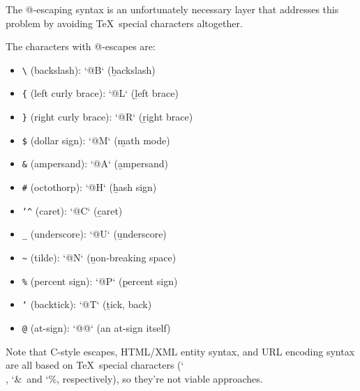 The @-escaping syntax is an unfortunately necessary layer that addresses this
problem by avoiding \TeX\ special characters altogether.

The characters with @-escapes are:
\begin{itemize}
    \item \b{\texttt{\textbackslash} (backslash)}: \tex`@B` (\b{b}ackslash)
    \item \b{\texttt{\{} (left curly brace)}: \tex`@L` (\b{l}eft brace)
    \item \b{\texttt{\}} (right curly brace)}: \tex`@R` (\b{r}ight brace)
    \item \b{\texttt{\$} (dollar sign)}: \tex`@M` (\b{m}ath mode)
    \item \b{\texttt{\&} (ampersand)}: \tex`@A` (\b{a}mpersand)
    \item \b{\texttt{\#} (octothorp)}: \tex`@H` (\b{h}ash sign)
    \item \b{\texttt{\char`\^} (caret)}: \tex`@C` (\b{c}aret)
    \item \b{\texttt{\_} (underscore)}: \tex`@U` (\b{u}nderscore)
    \item \b{\texttt{\textasciitilde} (tilde)}: \tex`@N` (\b{n}on-breaking space)
    \item \b{\texttt{\%} (percent sign)}: \tex`@P` (\b{p}ercent sign)
    \item \b{\texttt{`} (backtick)}: \tex`@T` (\b{t}ick, back)
    \item \b{\texttt{@} (at-sign)}: \tex`@@` (an at-sign itself)
\end{itemize}

Note that C-style escapes, HTML/XML entity syntax, and URL encoding syntax are
all based on \TeX\ special characters (\char`\\, \char`\&\ and \char`\%,
respectively), so they're not viable approaches.